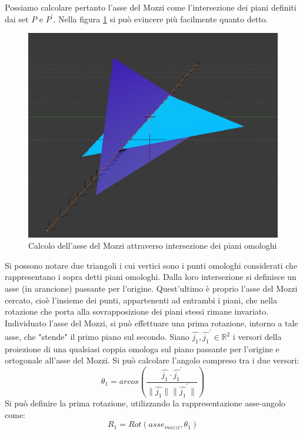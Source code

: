 Possiamo calcolare pertanto l'asse del Mozzi come l'intersezione dei piani definiti dai set $P$ e $P^{'}$. Nella figura \ref{rot:gb:imgMozzi} si può evincere più facilmente quanto detto. 
\begin{figure}[h]
	\centering
	\includegraphics[width=420pt]{imgs/AsseMozzi.jpg}
	\caption{Calcolo dell'asse del Mozzi attraverso intersezione dei piani omologhi}
	\label{rot:gb:imgMozzi}
\end{figure} 

Si possono notare due triangoli i cui vertici sono i punti omologhi considerati che rappresentano i sopra detti piani omologhi. Dalla loro intersezione si definisce un asse (in arancione) passante per l'origine. Quest'ultimo è proprio l'asse del Mozzi cercato, cioè l'insieme dei punti, appartenenti ad entrambi i piani, che nella rotazione che porta alla sovrapposizione dei piani stessi rimane invariato.
Individuato l'asse del Mozzi, si può effettuare una prima rotazione, intorno a tale asse, che "stende" il primo piano sul secondo. Siano $\hat{j_1}, \hat{j_1}^{'} \in \mathbb{R}^2$ i versori della proiezione di una qualsiasi coppia omologa sul piano passante per l'origine e ortogonale all'asse del Mozzi. Si può calcolare l'angolo compreso tra i due versori:
\begin{equation}
	\theta_1 = arcos(\frac{\hat{j_1} \cdot \hat{j_1}^{'}}{\| \hat{j_1}\| \|\hat{j_1}^{'}\|})
\end{equation}
Si può definire la prima rotazione, utilizzando la rappresentazione asse-angolo come:
\begin{equation}
	R_1 = Rot(asse_{mozzi}, \theta_1)
\end{equation} 

